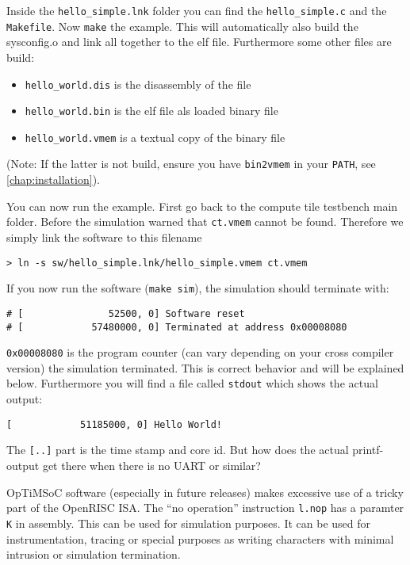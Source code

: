 Inside the \verb|hello_simple.lnk| folder you can find the
\verb|hello_simple.c| and the \verb|Makefile|. Now \verb|make| the
example. This will automatically also build the sysconfig.o and link
all together to the elf file. Furthermore some other files are build:

\begin{itemize}
\item \verb|hello_world.dis| is the disassembly of the file
\item \verb|hello_world.bin| is the elf file als loaded binary file
\item \verb|hello_world.vmem| is a textual copy of the binary file
\end{itemize}

(Note: If the latter is not build, ensure you have \verb|bin2vmem| in
your \verb|PATH|, see
\ref{chap:installation}).

You can now run the example. First go back to the compute tile
testbench main folder. Before the simulation warned that
\verb|ct.vmem| cannot be found. Therefore we simply link the software
to this filename

\begin{verbatim}
> ln -s sw/hello_simple.lnk/hello_simple.vmem ct.vmem
\end{verbatim}

If you now run the software (\verb|make sim|), the simulation should
terminate with:

\begin{verbatim}
# [               52500, 0] Software reset
# [            57480000, 0] Terminated at address 0x00008080
\end{verbatim}

\verb|0x00008080| is the program counter (can vary depending on your cross
compiler version) the simulation terminated. This is correct behavior
and will be explained below. Furthermore you will find a file called
\verb|stdout| which shows the actual output:

\begin{verbatim}
[            51185000, 0] Hello World!
\end{verbatim}

The \verb|[..]| part is the time stamp and core id. But how does the
actual printf-output get there when there is no UART or similar?

OpTiMSoC software (especially in future releases) makes excessive use
of a tricky part of the OpenRISC ISA. The ``no operation'' instruction
\verb|l.nop| has a paramter \verb|K| in assembly. This can be used for
simulation purposes. It can be used for instrumentation, tracing or
special purposes as writing characters with minimal intrusion or
simulation termination.

